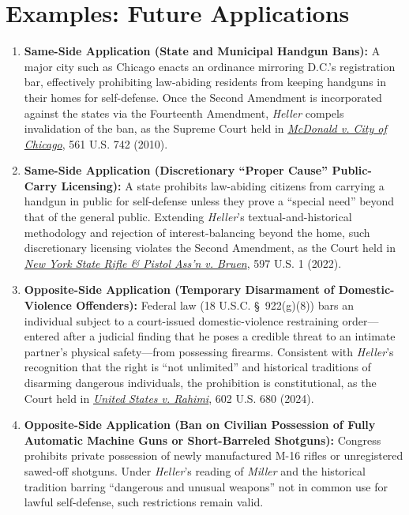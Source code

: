 \documentclass[12pt]{article}
\begin{document}
\section{Examples: Future Applications}
\begin{enumerate}
  \item \textbf{Same-Side Application (State and Municipal Handgun Bans):} A major city such as Chicago enacts an ordinance mirroring D.C.'s registration bar, effectively prohibiting law-abiding residents from keeping handguns in their homes for self-defense. Once the Second Amendment is incorporated against the states via the Fourteenth Amendment, \textit{Heller} compels invalidation of the ban, as the Supreme Court held in \href{https://supreme.justia.com/cases/federal/us/561/742/}{\textit{McDonald v. City of Chicago}}, 561 U.S. 742 (2010).
  \item \textbf{Same-Side Application (Discretionary ``Proper Cause'' Public-Carry Licensing):} A state prohibits law-abiding citizens from carrying a handgun in public for self-defense unless they prove a ``special need'' beyond that of the general public. Extending \textit{Heller}'s textual-and-historical methodology and rejection of interest-balancing beyond the home, such discretionary licensing violates the Second Amendment, as the Court held in \href{https://supreme.justia.com/cases/federal/us/597/20-843/}{\textit{New York State Rifle \& Pistol Ass'n v. Bruen}}, 597 U.S. 1 (2022).
  \item \textbf{Opposite-Side Application (Temporary Disarmament of Domestic-Violence Offenders):} Federal law (18 U.S.C. \S\ 922(g)(8)) bars an individual subject to a court-issued domestic-violence restraining order---entered after a judicial finding that he poses a credible threat to an intimate partner's physical safety---from possessing firearms. Consistent with \textit{Heller}'s recognition that the right is ``not unlimited'' and historical traditions of disarming dangerous individuals, the prohibition is constitutional, as the Court held in \href{https://www.supremecourt.gov/opinions/23pdf/22-915_8o6b.pdf}{\textit{United States v. Rahimi}}, 602 U.S. 680 (2024).
  \item \textbf{Opposite-Side Application (Ban on Civilian Possession of Fully Automatic Machine Guns or Short-Barreled Shotguns):} Congress prohibits private possession of newly manufactured M-16 rifles or unregistered sawed-off shotguns. Under \textit{Heller}'s reading of \textit{Miller} and the historical tradition barring ``dangerous and unusual weapons'' not in common use for lawful self-defense, such restrictions remain valid.

\end{enumerate}
\end{document}
